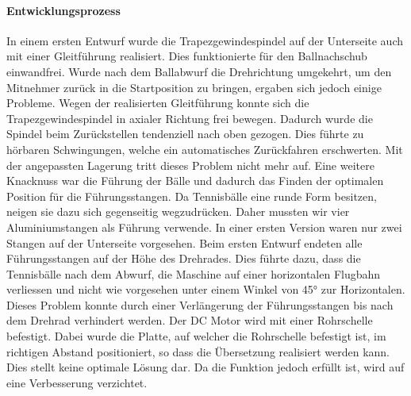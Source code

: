 \paragraph{Entwicklungsprozess\\}
In einem ersten Entwurf wurde die Trapezgewindespindel auf der Unterseite auch mit einer Gleitführung realisiert. Dies funktionierte für den Ballnachschub einwandfrei. Wurde nach dem Ballabwurf die Drehrichtung umgekehrt, um den Mitnehmer zurück in die Startposition zu bringen, ergaben sich jedoch einige Probleme. Wegen der realisierten Gleitführung konnte sich die Trapezgewindespindel in axialer Richtung frei bewegen. Dadurch wurde die Spindel beim Zurückstellen tendenziell nach oben gezogen. Dies führte zu hörbaren Schwingungen, welche ein automatisches Zurückfahren erschwerten. Mit der angepassten Lagerung tritt dieses Problem nicht mehr auf. 
Eine weitere Knacknuss war die Führung der Bälle und dadurch das Finden der optimalen Position für die Führungsstangen. Da Tennisbälle eine runde Form besitzen, neigen sie dazu sich gegenseitig wegzudrücken. Daher mussten wir vier Aluminiumstangen als Führung verwende. In einer ersten Version waren nur zwei Stangen auf der Unterseite vorgesehen. 
Beim ersten Entwurf endeten alle Führungsstangen auf der Höhe des Drehrades. Dies führte dazu, dass die Tennisbälle nach dem Abwurf, die Maschine auf einer horizontalen Flugbahn verliessen und nicht wie vorgesehen unter einem Winkel von 45° zur Horizontalen. Dieses Problem konnte durch einer Verlängerung der Führungsstangen bis nach dem Drehrad verhindert werden. 
Der DC Motor wird mit einer Rohrschelle befestigt. Dabei wurde die Platte, auf welcher die Rohrschelle befestigt ist, im richtigen Abstand positioniert, so dass die Übersetzung realisiert werden kann. Dies stellt keine optimale Lösung dar. Da die Funktion jedoch erfüllt ist, wird auf eine Verbesserung verzichtet. 
